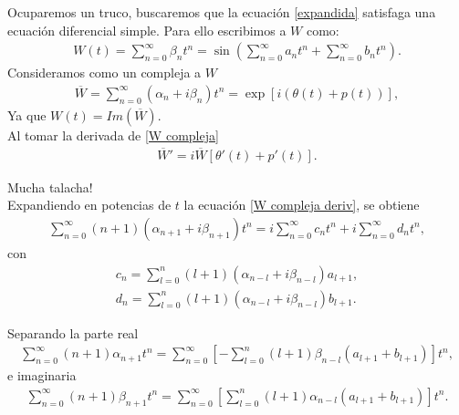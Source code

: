 \documentclass[11pt]{beamer}
\theoremstyle{definition}
\begin{document}
\begin{frame}
Ocuparemos un truco, buscaremos que la ecuaci\'on \eqref{expandida} satisfaga una ecuaci\'on diferencial simple. Para ello escribimos a $W$ como:
\begin{eqnarray}
W(t)=\sum_{n=0}^{\infty}\beta_{n}t^{n}=\sin\left(\sum_{n=0}^{\infty}a_{n}t^{n}+\sum_{n=0}^{\infty}
b_{n}t^{n}\right).
\end{eqnarray}
Consideramos como un compleja a $W$
\begin{eqnarray}
\overline{W}=\sum_{n=0}^{\infty}(\alpha_{n}+i\beta_{n})t^{n}=\exp[i(\theta(t)+p(t))],
\label{W compleja}
\end{eqnarray}
Ya que $W(t)=Im(\overline{W})$.\\
Al tomar la derivada de \eqref{W compleja}
\begin{eqnarray}
\overline{W}'=i\overline{W}[\theta '(t)+p'(t)].
\label{W compleja deriv}
\end{eqnarray}
\end{frame}
\begin{frame}
Mucha talacha!\\
Expandiendo en potencias de $t$ la ecuaci\'on \eqref{W compleja deriv}, se obtiene
\begin{eqnarray}
\sum_{n=0}^{\infty}(n+1)(\alpha_{n+1}+i\beta_{n+1})t^{n}=i\sum_{n=0}^{\infty}c_{n}t^{n}+i\sum_{n=0}^{\infty}d_{n}t^{n},
\end{eqnarray}
con
\begin{eqnarray}
c_{n}=\sum_{l=0}^{n}(l+1)(\alpha_{n-l}+i\beta_{n-l})a_{l+1}, \\
d_{n}=\sum_{l=0}^{n}(l+1)(\alpha_{n-l}+i\beta_{n-l})b_{l+1}.
\end{eqnarray}

\end{frame}
\begin{frame}
Separando la parte real 
\begin{eqnarray}
\sum_{n=0}^{\infty}(n+1)\alpha_{n+1}t^{n}=\sum_{n=0}^{\infty}\left[-\sum_{l=0}^{n}(l+1)\beta_{n-l}(a_{l+1}+b_{l+1})\right]t^{n},
\label{parte real}
\end{eqnarray}
e imaginaria
\begin{eqnarray}
\sum_{n=0}^{\infty}(n+1)\beta_{n+1}t^{n}=\sum_{n=0}^{\infty}\left[\sum_{l=0}^{n}(l+1)\alpha_{n-l}(a_{l+1}+b_{l+1})\right]t^{n}.
\label{parte compleja}
\end{eqnarray}
\end{frame}
\end{document}
